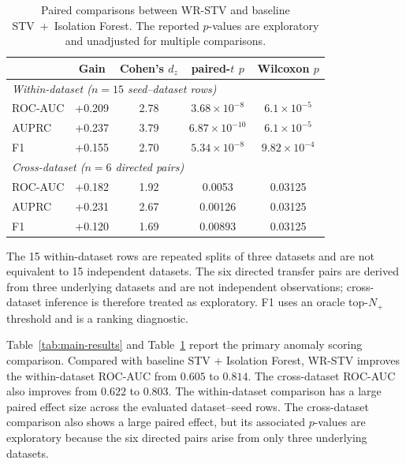 \documentclass[informatics,article,submit,moreauthors]{Definitions/mdpi}
\newcommand{\rev}[1]{{\color{revisionblue}#1}}
\begin{document}
\begin{table}[t]
    \centering
    \caption{\rev{Paired comparisons between WR-STV and baseline
        STV~+~Isolation Forest. The reported \(p\)-values are exploratory
        and unadjusted for multiple comparisons.}}
    \label{tab:main-stats}
    \begin{tabular}{lcccc}
        \toprule
        & \textbf{Gain} & \textbf{Cohen's \(d_z\)} &
        \textbf{paired-\(t\) \(p\)} & \textbf{Wilcoxon \(p\)} \\
        \midrule
        \multicolumn{5}{l}{\textit{Within-dataset
        (\(n=15\) seed--dataset rows)}} \\
        ROC-AUC & +0.209 & 2.78 & \(3.68 \times 10^{-8}\) &
        \(6.1 \times 10^{-5}\) \\
        AUPRC   & +0.237 & 3.79 & \(6.87 \times 10^{-10}\) &
        \(6.1 \times 10^{-5}\) \\
        F1      & +0.155 & 2.70 & \(5.34 \times 10^{-8}\) &
        \(9.82 \times 10^{-4}\) \\
        \midrule
        \multicolumn{5}{l}{\textit{Cross-dataset
        (\(n=6\) directed pairs)}} \\
        ROC-AUC & +0.182 & 1.92 & 0.0053 & 0.03125 \\
        AUPRC   & +0.231 & 2.67 & 0.00126 & 0.03125 \\
        F1      & +0.120 & 1.69 & 0.00893 & 0.03125 \\
        \bottomrule
    \end{tabular}

    \vspace{3pt}
    \footnotesize
    \rev{The 15 within-dataset rows are repeated splits of three datasets
    and are not equivalent to 15 independent datasets. The six directed
    transfer pairs are derived from three underlying datasets and are not
    independent observations; cross-dataset inference is therefore treated
    as exploratory. F1 uses an oracle top-\(N_{+}\) threshold and is a
    ranking diagnostic.}
\end{table}

Table~\ref{tab:main-results} and Table~\ref{tab:main-stats} report the
primary anomaly scoring comparison. Compared with baseline STV +
Isolation Forest, WR-STV improves the within-dataset ROC-AUC from
\(0.605\) to \(0.814\). The cross-dataset ROC-AUC also improves from
\(0.622\) to \(0.803\). \rev{The within-dataset comparison has a large
paired effect size across the evaluated dataset--seed rows. The
cross-dataset comparison also shows a large paired effect, but its
associated \(p\)-values are exploratory because the six directed pairs
arise from only three underlying datasets.}
\end{document}
